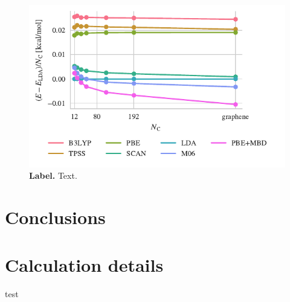 \begin{figure}

\centering
\includegraphics{../media/flakes}
\caption{\textbf{Label.} Text.
}\label{fig:flakes}
\end{figure}

\section{Conclusions}

\section{Calculation details}

test
